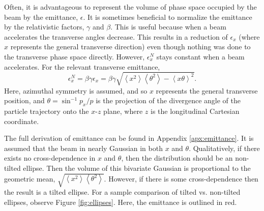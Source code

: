 Often, it is advantageous to represent the volume of phase space occupied by the beam by the emittance, $\epsilon$. It is sometimes beneficial to normalize the emittance by the relativistic factors, $\gamma$ and $\beta$. This is useful because when a beam accelerates the transverse angles decrease. This results in a  reduction of $\epsilon_x$ (where $x$ represents the general transverse direction) even though nothing was done to the transverse phase space directly. However, $\epsilon_x ^N$ stays constant when a beam accelerates. For the relevant transverse emittance,
%
\begin{equation}
\label{eqn:emittancedef}
\epsilon_x^N=\beta\gamma\epsilon_x=\beta\gamma\sqrt{\left<x^2\right>\left<\theta^2\right>-\left<x\theta\right>^2}.
\end{equation}
%
Here, azimuthal symmetry is assumed, and so $x$ represents the general transverse position, and $\theta =\sin^{-1} p_x/p$ is the projection of the divergence angle of the particle trajectory onto the $x$-$z$ plane, where $z$ is the longitudinal Cartesian coordinate. 

The full derivation of emittance can be found in Appendix \ref{apx:emittance}. It is assumed that the beam in nearly Gaussian in both $x$ and $\theta$. Qualitatively, if there exists no cross-dependence in $x$ and $\theta$, then the distribution should be an non-tilted ellipse. Then the volume of this bivariate Gaussian is proportional to the geometric mean, $\sqrt{\left<x^2\right>\left<\theta^2\right>}$. However, if there is some cross-dependence then the result is a tilted ellipse. For a sample comparison of tilted vs. non-tilted ellipses, observe Figure \ref{fig:ellipses}. Here, the emittance is outlined in red.

